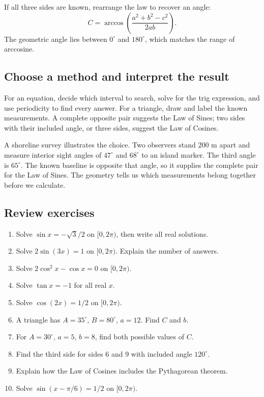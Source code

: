If all three sides are known, rearrange the law to recover an angle: \[
C=\arccos\left(\frac{a^2+b^2-c^2}{2ab}\right).
\] The geometric angle lies between \(0^\circ\) and \(180^\circ\), which matches the range of arccosine.

\hypertarget{m5-choose-a-method-and-interpret-the-result}{%
\subsection{Choose a method and interpret the result}\label{m5-choose-a-method-and-interpret-the-result}}

For an equation, decide which interval to search, solve for the trig expression, and use periodicity to find every answer. For a triangle, draw and label the known measurements. A complete opposite pair suggests the Law of Sines; two sides with their included angle, or three sides, suggest the Law of Cosines.

A shoreline survey illustrates the choice. Two observers stand 200 m apart and measure interior sight angles of \(47^\circ\) and \(68^\circ\) to an island marker. The third angle is \(65^\circ\). The known baseline is opposite that angle, so it supplies the complete pair for the Law of Sines. The geometry tells us which measurements belong together before we calculate.

\hypertarget{m5-review-exercises}{%
\subsection{Review exercises}\label{m5-review-exercises}}

\begin{enumerate}
\def\labelenumi{\arabic{enumi}.}
\tightlist
\item
  Solve \(\sin x=-\sqrt3/2\) on \([0,2\pi)\), then write all real solutions.
\item
  Solve \(2\sin(3x)=1\) on \([0,2\pi)\). Explain the number of answers.
\item
  Solve \(2\cos^2x-\cos x=0\) on \([0,2\pi)\).
\item
  Solve \(\tan x=-1\) for all real \(x\).
\item
  Solve \(\cos(2x)=1/2\) on \([0,2\pi)\).
\item
  A triangle has \(A=35^\circ\), \(B=80^\circ\), \(a=12\). Find \(C\) and \(b\).
\item
  For \(A=30^\circ\), \(a=5\), \(b=8\), find both possible values of \(C\).
\item
  Find the third side for sides 6 and 9 with included angle \(120^\circ\).
\item
  Explain how the Law of Cosines includes the Pythagorean theorem.
\item
  Solve \(\sin(x-\pi/6)=1/2\) on \([0,2\pi)\).
\end{enumerate}

